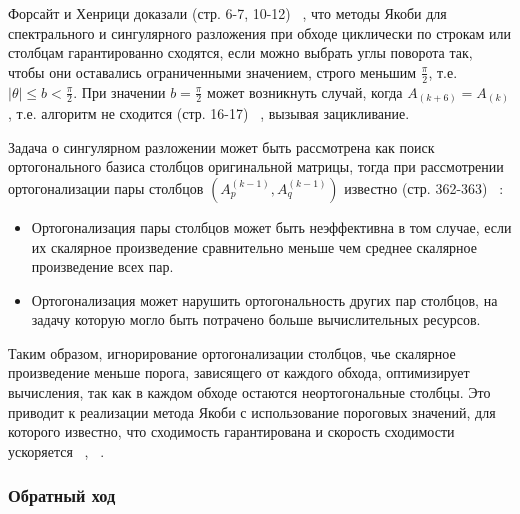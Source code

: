 Форсайт и Хенрици доказали (стр. 6-7, 10-12) ~\cite{Forsythe1960}, что методы Якоби для спектрального и сингулярного разложения при обходе циклически по строкам или столбцам гарантированно сходятся, если можно выбрать углы поворота так, чтобы они оставались ограниченными значением, строго меньшим $\frac{\pi}{2}$, т.е. $\left|\theta\right| \le b <\frac{\pi}{2}$. При значении $b = \frac{\pi}{2}$ может возникнуть случай, когда $A_{(k+6)}=A_{(k)}$, т.е. алгоритм не сходится (стр. 16-17) ~\cite{Forsythe1960}, вызывая зацикливание. 

Задача о сингулярном разложении может быть рассмотрена как поиск ортогонального базиса столбцов оригинальной матрицы, тогда при рассмотрении ортогонализации пары столбцов $(A^{(k-1)}_p, A^{(k-1)}_q)$ известно (стр. 362-363) ~\cite{deRijk1989}:
\begin{itemize}
    \item Ортогонализация пары столбцов может быть неэффективна в том случае, если их скалярное произведение сравнительно меньше чем среднее скалярное произведение всех пар.
    \item Ортогонализация может нарушить ортогональность других пар столбцов, на задачу которую могло быть потрачено больше вычислительных ресурсов. 
\end{itemize}
Таким образом, игнорирование ортогонализации столбцов, чье скалярное произведение меньше порога, зависящего от каждого обхода,  оптимизирует вычисления, так как в каждом обходе остаются неортогональные столбцы. Это приводит к реализации метода Якоби с использование пороговых значений, для которого известно, что сходимость гарантирована и скорость сходимости ускоряется ~\cite{Dongarra2018}, ~\cite{Forsythe1960}. 

\subsubsection{Обратный ход}

